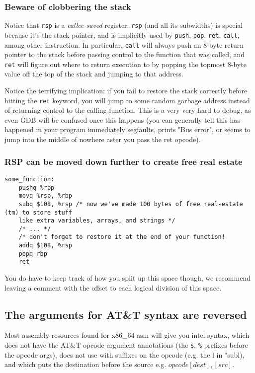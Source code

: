 \documentclass[11pt]{article}
\begin{document}
\subsubsection{Beware of clobbering the stack}

Notice that \texttt{rsp} is a \emph{callee-saved} register. \texttt{rsp} (and all its
subwidths) is special because it's the stack pointer, and is implicitly used by
\texttt{push}, \texttt{pop}, \texttt{ret}, \texttt{call}, among other instruction. In
particular, \texttt{call} will always push an 8-byte return pointer to the stack before
passing control to the function that was called, and \texttt{ret} will figure out where to
return execution to by popping the topmost 8-byte value off the top of the stack and
jumping to that address.

Notice the terrifying implication: if you fail to restore the stack correctly before
hitting the \texttt{ret} keyword, you will jump to some random garbage address instead of
returning control to the calling function. This is a very very hard to debug, as even GDB
will be confused once this happens (you can generally tell this has happened in your
program immediately segfaults, prints "Bus error", or seems to jump into the middle of
nowhere aster you pass the ret opcode).

\subsubsection{RSP can be moved down further to create free real estate}

\begin{lstlisting}
some_function:
    pushq %rbp
    movq %rsp, %rbp
    subq $108, %rsp /* now we've made 100 bytes of free real-estate (tm) to store stuff
    like extra variables, arrays, and strings */
    /* ... */
    /* don't forget to restore it at the end of your function!
    addq $108, %rsp
    popq rbp
    ret
\end{lstlisting}

You do have to keep track of how you split up this space though, we recommend leaving a
comment with the offset to each logical division of this space.

\subsection{The arguments for AT\&T syntax are reversed}

Most assembly resources found for x86\_64 asm will give you intel syntax, which does not
have the AT\&T opcode argument annotations (the \texttt{\$}, \texttt{\%} prefixes before the
opcode args), does not use with suffixes on the opcode (e.g. the l in "subl),
and which puts the destination before the source e.g. $opcode [dest], [src]$.
\end{document}
